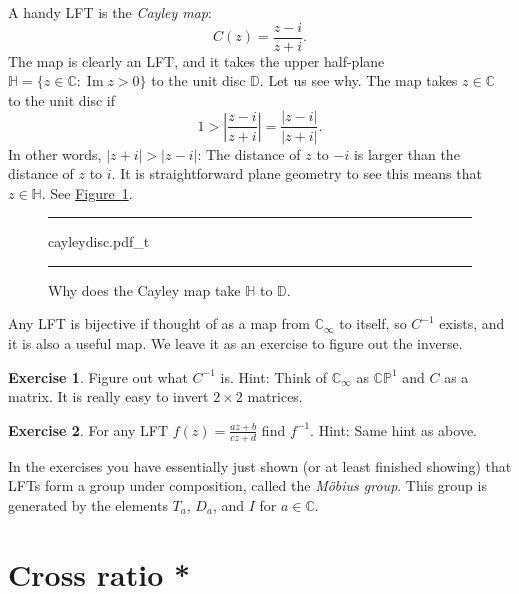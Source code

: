 \documentclass[12pt,openany]{book}
\renewcommand{\Im}{\operatorname{Im}}
\newcommand{\sabs}[1]{\lvert {#1} \rvert}
\newcommand{\abs}[1]{\left\lvert {#1} \right\rvert}
\newcommand{\C}{{\mathbb{C}}}
\newcommand{\D}{{\mathbb{D}}}
\newcommand{\bH}{{\mathbb{H}}}
\newcommand{\bP}{{\mathbb{P}}}
\newcommand{\myindex}[1]{#1\index{#1}}
\theoremstyle{plain}
\theoremstyle{remark}
\theoremstyle{definition}
\newenvironment{exbox}{%
    \def\FrameCommand{\vrule width 1pt \relax\hspace {10pt}}%
    \MakeFramed {\advance \hsize -\width \FrameRestore }%
}{%
    \endMakeFramed
}
\newenvironment{myfig}{%
\begin{figure}[h!t]
\noindent\rule{\textwidth}{0.4pt}\vspace{12pt}\par\centering}%
{\par\noindent\rule{\textwidth}{0.4pt}
\end{figure}}
\theoremstyle{exercise}
\newtheorem{exercise}{Exercise}[section]
\theoremstyle{example}
\newcommand{\figureref}[1]{\hyperref[#1]{Figure~\ref*{#1}}}
\begin{document}
\medskip

A handy LFT is the
\emph{\myindex{Cayley map}}:
\begin{equation*}
C(z)
=
\frac{z - i}{z + i} .
\end{equation*}
The map is clearly an LFT, and it
takes the upper half-plane $\bH = \{ z \in \C : \Im z > 0 \}$ to the
unit disc $\D$.  Let us see why.  The map takes $z \in \C$ to the unit disc if
\begin{equation*}
1 > \abs{\frac{z - i}{z + i} }
=
\frac{\sabs{z - i}}{\sabs{z + i}} .
\end{equation*}
In other words, $\sabs{z+i} > \sabs{z - i}$: The distance of $z$
to $-i$ is larger than the distance of $z$ to $i$.  It is straightforward
plane geometry to see this means that $z \in \bH$.  See
\figureref{fig:cayleydisc}.

\begin{myfig}
{cayleydisc.pdf_t}
\caption{Why does the Cayley map take $\bH$ to $\D$.\label{fig:cayleydisc}}
\end{myfig}

Any LFT is bijective if thought of as a map from $\C_\infty$
to itself, so $C^{-1}$ exists, and it is also a useful map.  We leave
it as an exercise to figure out the inverse.

\begin{exbox}
\begin{exercise}
Figure out what $C^{-1}$ is.  Hint: Think of $\C_\infty$ as $\C \bP^1$
and $C$ as a matrix.  It is really easy to invert $2 \times 2$ matrices.
\end{exercise}

\begin{exercise}
For any LFT $f(z) = \frac{az+b}{cz+d}$ find $f^{-1}$.
Hint: Same hint as above.
\end{exercise}
\end{exbox}

In the exercises you have essentially just shown (or at least finished
showing) that LFTs form a group under composition,
called the \emph{\myindex{M\"obius group}}.
This group is generated by the elements
$T_a$, $D_a$, and $I$ for $a\in \C$.


\section{Cross ratio *}
\end{document}
